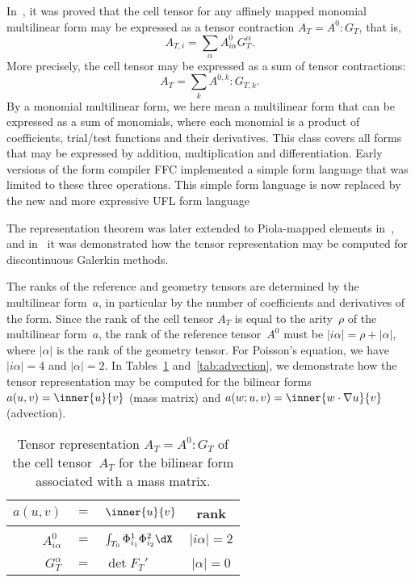 In~\cite{KirbyLogg2006}, it was proved that the cell tensor for any
affinely mapped monomial multilinear form may be expressed as a tensor
contraction $A_T = A^0 : G_T$, that is,
\begin{equation*}
  A_{T,i} = \sum_{\alpha} A^0_{i\alpha} G_T^{\alpha}.
\end{equation*}
More precisely, the cell tensor may be expressed as a sum of tensor
contractions:
\begin{equation} \label{eq:tensorcontraction}
  A_T = \sum_k A^{0,k} : G_{T,k}.
\end{equation}
By a monomial multilinear form, we here mean a multilinear form that
can be expressed as a sum of monomials, where each monomial is a
product of coefficients, trial/test functions and their derivatives.
This class covers all forms that may be expressed by addition,
multiplication and differentiation. Early versions of the form
compiler FFC implemented a simple form language that was limited to
these three operations. This simple form language is now replaced by
the new and more expressive UFL form language

The representation theorem was later extended to Piola-mapped elements
in~\cite{RognesKirbyLogg2009}, and in~\cite{OlgaardLoggWells2008} it was
demonstrated how the tensor representation may be computed for
discontinuous Galerkin methods.

The ranks of the reference and geometry tensors are determined by the
multilinear form~$a$, in particular by the number of coefficients and
derivatives of the form. Since the rank of the cell tensor $A_T$ is
equal to the arity~$\rho$ of the multilinear form~$a$, the rank of the
reference tensor~$A^0$ must be $|i\alpha| = \rho + |\alpha|$, where
$|\alpha|$ is the rank of the geometry tensor. For Poisson's equation,
we have $|i\alpha| = 4$ and $|\alpha| = 2$. In Tables~\ref{tab:mass}
and~\ref{tab:advection}, we demonstrate how the tensor representation
may be computed for the bilinear forms $a(u, v) = \inner{u}{v}$ (mass
matrix) and $a(w; u, v) = \inner{w \cdot \nabla u}{v}$ (advection).

\begin{table}[htbp]
  \begin{center}
    \begin{tabular}{|rcl|c|}
      \hline
      $a(u, v)$ &$=$& $\inner{u}{v}$ & rank \\
      \hline
      \hline
      &&&\\[-2ex]
      $A^0_{i\alpha}$ &$=$& $\int_{T_0} \Phi_{i_1}^{1} \Phi_{i_2}^{2} \dX$
      & $|i\alpha| = 2$ \\[1ex]
      \hline
      &&&\\[-2ex]
      $G_T^{\alpha}$ &$=$& $\det F_T'$
      & $|\alpha| = 0$ \\[1ex]
      \hline
    \end{tabular}
    \caption{Tensor representation $A_T = A^0 : G_T$ of the cell
      tensor~$A_T$ for the bilinear form associated with a mass
      matrix.}
    \label{tab:mass}
  \end{center}
\end{table}


